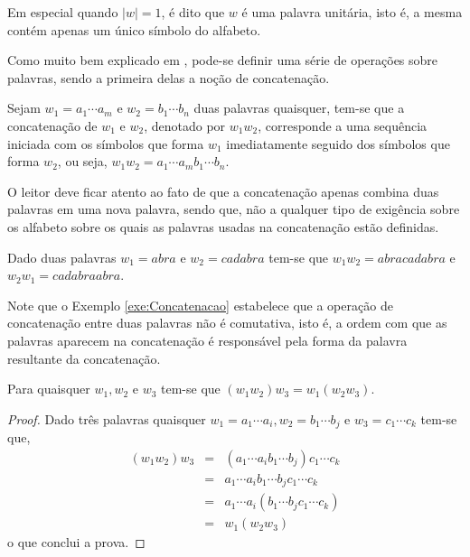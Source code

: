 \begin{rema}
	Em especial quando $|w| = 1$, é dito que $w$ é uma palavra unitária, isto é, a mesma contém apenas um único símbolo do alfabeto.
\end{rema}

Como muito bem explicado em \cite{benjaLivro2010, hopcroft2008, linz2006}, pode-se definir uma série de operações sobre palavras, sendo a primeira delas  a noção de concatenação.

\begin{definition}\label{def:Concatenacao}
	Sejam $w_1 = a_1\cdots a_m$ e $w_2 = b_1\cdots b_n$ duas palavras quaisquer, tem-se que a concatenação de $w_1$ e $w_2$, denotado por $w_1w_2$, corresponde a uma sequência iniciada com os símbolos que forma $w_1$ imediatamente seguido dos símbolos que forma $w_2$, ou seja, $w_1w_2 = a_1\cdots a_mb_1\cdots b_n$.
\end{definition}

\begin{rema}
	O leitor deve ficar atento ao fato de que a concatenação apenas combina duas palavras em uma nova palavra, sendo que, não a qualquer tipo de exigência sobre os alfabeto sobre os quais as palavras usadas na concatenação estão definidas.
\end{rema}

\begin{exem}\label{exe:Concatenacao}
	Dado duas palavras $w_1 = abra$ e $w_2 = cadabra$ tem-se que $w_1w_2 = abracadabra$ e $w_2w_1 = cadabraabra$.
\end{exem}

Note que o Exemplo \ref{exe:Concatenacao} estabelece que a operação de concatenação entre duas palavras não é comutativa, isto é, a ordem com que as palavras aparecem na concatenação é responsável pela forma da palavra resultante da concatenação.

\begin{theorem}\label{teo:AssociatividaeConcatenacao}
	Para quaisquer $w_1, w_2$ e $w_3$ tem-se que $(w_1w_2)w_3 = w_1(w_2w_3)$.
\end{theorem}

\begin{proof}
	Dado três palavras quaisquer $w_1 = a_1\cdots a_i, w_2 = b_1\cdots b_j$ e $w_3 = c_1\cdots c_k$ tem-se que,
	\begin{eqnarray*}
		(w_1w_2)w_3 & = & (a_1\cdots a_ib_1\cdots b_j)c_1\cdots c_k\\
		& = & a_1\cdots a_ib_1\cdots b_jc_1\cdots c_k\\
		& = & a_1\cdots a_i(b_1\cdots b_jc_1\cdots c_k)\\
		& = & w_1(w_2w_3)
	\end{eqnarray*}
	o que conclui a prova.
\end{proof}

